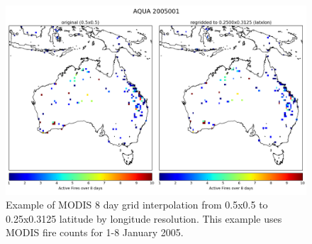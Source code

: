       \begin{figure}[!htbp]\begin{center}
          \includegraphics[width=\textwidth]{Figures/MODIS_Regrid_Comparison.png}
          \caption{Example of MODIS 8 day grid interpolation from 0.5x0.5 to 0.25x0.3125 latitude by longitude resolution.
            This example uses MODIS fire counts for 1-8 January 2005.}
          \label{ch_HCHO:fig:modisinterpolation}
        \end{center}\end{figure}